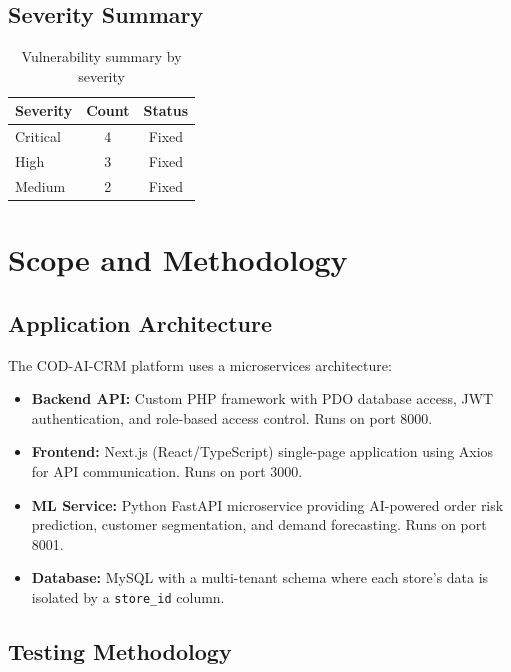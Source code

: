 \documentclass[12pt,a4paper]{article}
\begin{document}
\subsection{Severity Summary}

\begin{table}[H]
\centering
\begin{tabular}{lcc}
\toprule
\textbf{Severity} & \textbf{Count} & \textbf{Status} \\
\midrule
\textcolor{critical}{Critical} & 4 & Fixed \\
\textcolor{high}{High} & 3 & Fixed \\
\textcolor{medium}{Medium} & 2 & Fixed \\
\bottomrule
\end{tabular}
\caption{Vulnerability summary by severity}
\end{table}

\section{Scope and Methodology}

\subsection{Application Architecture}

The COD-AI-CRM platform uses a microservices architecture:

\begin{itemize}
  \item \textbf{Backend API:} Custom PHP framework with PDO database access, JWT authentication, and role-based access control. Runs on port 8000.
  \item \textbf{Frontend:} Next.js (React/TypeScript) single-page application using Axios for API communication. Runs on port 3000.
  \item \textbf{ML Service:} Python FastAPI microservice providing AI-powered order risk prediction, customer segmentation, and demand forecasting. Runs on port 8001.
  \item \textbf{Database:} MySQL with a multi-tenant schema where each store's data is isolated by a \texttt{store\_id} column.
\end{itemize}

\subsection{Testing Methodology}
\end{document}
